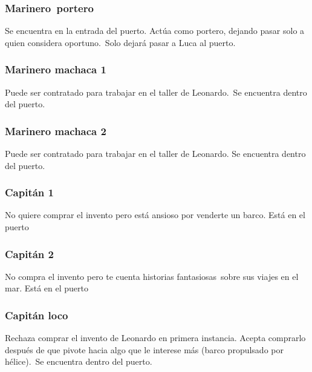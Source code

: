 \subsubsection[Marinero\ portero]{ Marinero\ portero}
\hypertarget{Toc484614232}{}{
Se encuentra en la entrada del puerto. Act\'ua como portero, dejando pasar solo a quien considera oportuno.\ Solo
dejar\'a pasar a Luca al puerto.}

\subsubsection[Marinero machaca 1]{ Marinero machaca 1}
\hypertarget{Toc484614233}{}{
Puede ser contratado para trabajar en el taller de Leonardo.\ Se encuentra dentro del puerto.}

\subsubsection[Marinero machaca 2]{ Marinero machaca 2}
\hypertarget{Toc484614234}{}{
Puede ser contratado para trabajar en el taller de Leonardo. Se encuentra dentro del puerto.}

\subsubsection[Capit\'an 1]{ Capit\'an 1}
\hypertarget{Toc484614235}{}{
No quiere comprar el invento pero est\'a ansioso por venderte un barco. Est\'a en el puerto}

\subsubsection[Capit\'an 2]{ Capit\'an 2}
\hypertarget{Toc484614236}{}{
No compra el invento pero te cuenta historias fantasiosas\ sobre sus viajes en el mar. Est\'a en el puerto}

\subsubsection[Capit\'an loco]{ Capit\'an loco}
\hypertarget{Toc484614237}{}{
Rechaza comprar el invento de Leonardo en primera instancia. Acepta comprarlo despu\'es de que pivote hacia algo que le
interese m\'as (barco propulsado por h\'elice).\ Se encuentra dentro del puerto.}

